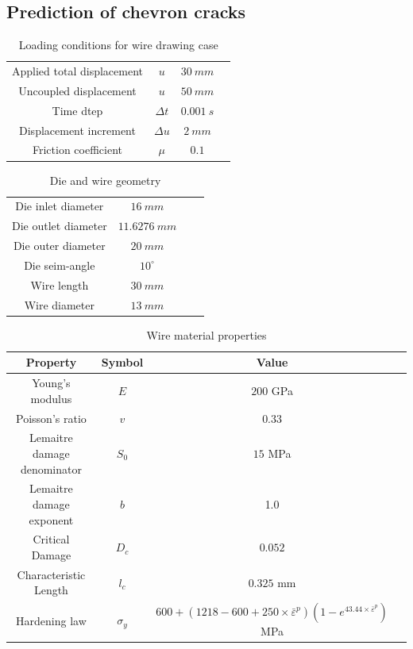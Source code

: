 \documentclass[sn-mathphys,Numbered,draft]{sn-jnl}%
\begin{document}
\FloatBarrier

\subsection{Prediction of chevron cracks}

\begin{table}[htb]
	\centering
		\begin{tabular}{cccc} \hline
		    Applied total displacement & $u$ & $30\ mm$ \\
		    Uncoupled displacement & $u$ & $50\ mm$ \\
		    Time dtep & $\Delta t$ & $0.001\ s$ \\
			Displacement increment  & $\Delta u$ & $2\ mm$   \\
			Friction coefficient & $\mu$ & $0.1$ \\
			\hline
		\end{tabular}
	\caption{Loading conditions for wire drawing case}
	\label{tab:material_properties}
\end{table}

\begin{table}[htb]
	\centering
		\begin{tabular}{cccc} \hline
		    Die inlet diameter & $16\ mm$ \\
		    Die outlet diameter & $11.6276\ mm$ \\
		    Die outer diameter & $20\ mm$ \\
		    Die seim-angle & $10^{\circ}$ \\
		    Wire length & $30\ mm$ \\
		    Wire diameter & $13\ mm$ \\
			\hline
		\end{tabular}
	\caption{Die and wire geometry}
	\label{tab:material_properties}
\end{table}

\begin{table}[htb]
	\centering
		\begin{tabular}{cccc} \hline
			Property & Symbol & Value  \\ \hline 
			Young's modulus & $E$ & $200$ GPa \\
			Poisson's ratio & $v$ & $0.33$   \\
			Lemaitre damage denominator & $S_0$ & $15$ MPa  \\
			Lemaitre damage exponent & $b$ & 1.0  \\
			Critical Damage & $D_c$ & $0.052$\\
			Characteristic Length & $l_c$ & $0.325$ mm  \\
			Hardening law & $\sigma_y$ & $600+(1218-600+250\times\bar{\varepsilon}^p)(1-e^{43.44\times\bar{\varepsilon}^p})$ MPa \\
			\hline
		\end{tabular}
	\caption{Wire material properties }
	\label{tab:material_properties}
\end{table}
\end{document}
